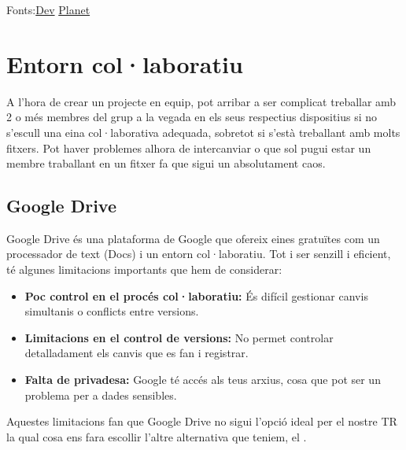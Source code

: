 Fonts:\href{https://dev.to/xploitcore/kde-vs-gnome-vs-others-choosing-the-best-linux-desktop-environment-in-2025-ab5}{Dev} \href{https://planet.communia.org/index.php/en/node/77}{Planet}



\section{Entorn col·laboratiu}\label{sec:4.3}
A l'hora de crear un projecte en equip, pot arribar a ser complicat treballar amb 2 o més membres del grup a la vegada en els seus respectius dispositius si no s'escull una eina col·laborativa adequada, sobretot si s'està treballant amb molts fitxers. Pot haver problemes alhora de intercanviar o que sol pugui estar un membre traballant en un fitxer fa que sigui un absolutament caos.
\subsection{Google Drive}
Google Drive és una plataforma de Google que ofereix eines gratuïtes com un processador de text (Docs) i un entorn col·laboratiu. Tot i ser senzill i eficient, té algunes limitacions importants que hem de considerar:
\begin{itemize}
 \item \textbf{Poc control en el procés col·laboratiu:} És difícil gestionar canvis simultanis o conflicts entre versions.
 \item \textbf{Limitacions en el control de versions:} No permet controlar detalladament els canvis que es fan i registrar.
 \item \textbf{Falta de privadesa:} Google té accés als teus arxius, cosa que pot ser un problema per a dades sensibles.
\end{itemize}
Aquestes limitacions fan que Google Drive no sigui l'opció ideal per el nostre TR la qual cosa ens fara escollir l'altre alternativa que teniem, el .
